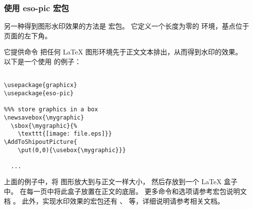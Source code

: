 \subsubsection{使用 eso-pic 宏包}\label{sssec:esopic}

另一种得到图形水印效果的方法是  宏包。
它定义一个长度为零的  环境，基点位于页面的左下角。

它提供命令  把任何 \LaTeX{} 图形环境先于正文文本排出，从而得到水印的效果。
以下是一个使用  的例子：

\begin{lstlisting}

\usepackage{graphicx}
\usepackage{eso-pic}

%%% store graphics in a box
\newsavebox{\mygraphic}
  \sbox{\mygraphic}{%
    \texttt{[image: file.eps]}}
\AddToShipoutPicture{
    \put(0,0){\usebox{\mygraphic}}}

  ...

\end{lstlisting}

上面的例子中，将  图形放大到与正文一样大小，
然后存放到一个 \LaTeX{} 盒子中。
在每一页中将此盒子放置在正文的底层。
更多命令和选项请参考宏包说明文档 \cite{eso-pic-doc}。
此外，实现水印效果的宏包还有  \cite{background-doc}、 \cite{xwatermark-doc} 等，详细说明请参考相关文档。

\endinput
